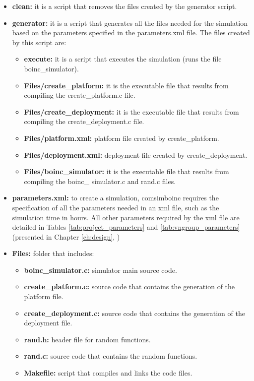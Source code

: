 \begin{itemize}

\item \textbf{clean:} it is a script that removes the files created by the generator script.

\item \textbf{generator:} it is a script that generates all the files needed for the simulation based on the parameters specified in the parameters.xml file. The files created by this script are:

\begin{itemize}

\item \textbf{execute:} it is a script that executes the simulation (runs the file boinc\_simulator).

\item \textbf{Files/create\_platform:} it is the executable file that results from compiling the create\_platform.c file.

\item \textbf{Files/create\_deployment:} it is the executable file that results from compiling the create\_deployment.c file.

\item \textbf{Files/platform.xml:} platform file created by create\_platform. 

\item \textbf{Files/deployment.xml:} deployment file created by create\_deployment. 

\item \textbf{Files/boinc\_simulator:} it is the executable file that results from compiling the boinc\_ simulator.c and rand.c files.

\end{itemize}

\item \textbf{parameters.xml:} to create a simulation, \gls{comsimboinc} requires the specification of all the parameters needed in an \gls{xml} file, such as the simulation time in hours. All other parameters required by the \gls{xml} file are detailed in Tables \ref{tab:project_parameters} and  \ref{tab:vngroup_parameters} (presented in Chapter \ref{ch:design}, \textit{})

\item \textbf{Files:} folder that includes:

\begin{itemize}
\item \textbf{boinc\_simulator.c:} simulator main source code.
\item \textbf{create\_platform.c:} source code that contains the generation of the platform file.
\item \textbf{create\_deployment.c:} source code that contains the generation of the deployment file.
\item \textbf{rand.h:} header file for random functions.
\item \textbf{rand.c:} source code that contains the random functions.
\item \textbf{Makefile:} script that compiles and links the code files.
\end{itemize}


\end{itemize}
